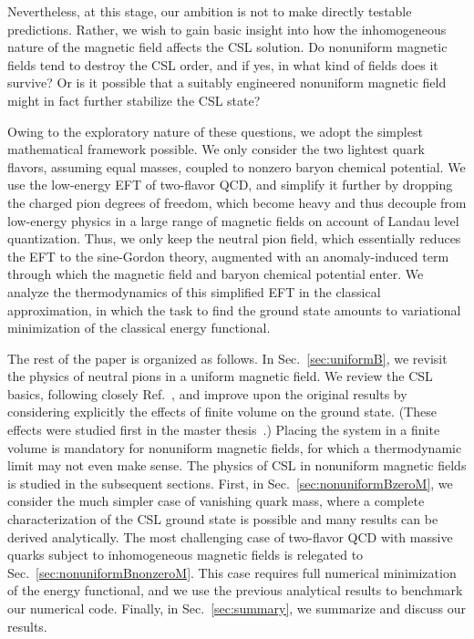 \documentclass[pdflatex,iicol,sn-mathphys-num]{sn-jnl}
\begin{document}
Nevertheless, at this stage, our ambition is not to make directly testable predictions. Rather, we wish to gain basic insight into how the inhomogeneous nature of the magnetic field affects the CSL solution. Do nonuniform magnetic fields tend to destroy the CSL order, and if yes, in what kind of fields does it survive? Or is it possible that a suitably engineered nonuniform magnetic field might in fact further stabilize the CSL state?

Owing to the exploratory nature of these questions, we adopt the simplest mathematical framework possible. We only consider the two lightest quark flavors, assuming equal masses, coupled to nonzero baryon chemical potential. We use the low-energy EFT of two-flavor QCD, and simplify it further by dropping the charged pion degrees of freedom, which become heavy and thus decouple from low-energy physics in a large range of magnetic fields on account of Landau level quantization. Thus, we only keep the neutral pion field, which essentially reduces the EFT to the sine-Gordon theory, augmented with an anomaly-induced term through which the magnetic field and baryon chemical potential enter. We analyze the thermodynamics of this simplified EFT in the classical approximation, in which the task to find the ground state amounts to variational minimization of the classical energy functional.

The rest of the paper is organized as follows. In Sec.~\ref{sec:uniformB}, we revisit the physics of neutral pions in a uniform magnetic field. We review the CSL basics, following closely Ref.~\cite{Brauner:2016pko}, and improve upon the original results by considering explicitly the effects of finite volume on the ground state. (These effects were studied first in the master thesis~\cite{Kar2022}.) Placing the system in a finite volume is mandatory for nonuniform magnetic fields, for which a thermodynamic limit may not even make sense.  The physics of CSL in nonuniform magnetic fields is studied in the subsequent sections. First, in Sec.~\ref{sec:nonuniformBzeroM}, we consider the much simpler case of vanishing quark mass, where a complete characterization of the CSL ground state is possible and many results can be derived analytically. The most challenging case of two-flavor QCD with massive quarks subject to inhomogeneous magnetic fields is relegated to Sec.~\ref{sec:nonuniformBnonzeroM}. This case requires full numerical minimization of the energy functional, and we use the previous analytical results to benchmark our numerical code. Finally, in Sec.~\ref{sec:summary}, we summarize and discuss our results.
\end{document}
